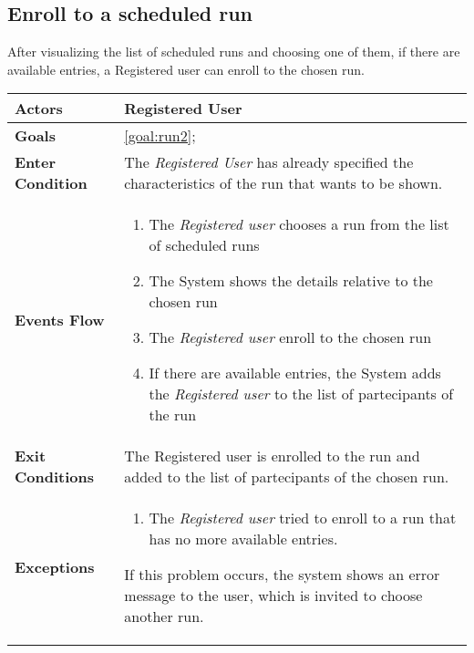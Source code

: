   \subsection{Enroll to a scheduled run}
After visualizing the list of scheduled runs and choosing one of them, if there are available entries, a Registered user can enroll to the chosen run. 

\begin{table}[H]
	\centering
    
    \begin{tabular}{|p{3.5cm}|p{10.3cm}|}
    
    \hline
    \textbf{\large{Actors}}  			& \tabitem Registered User 	\\
    				 					
    \hline
    \textbf{\large{Goals}} 				& \ref{goal:run2};\\
    
    \hline
    \textbf{\large{Enter Condition}}	& The \emph{Registered User} has already specified the characteristics of the run that wants to be shown.		\\
    
    \hline
    \textbf{\large{Events Flow}}		& \begin{enumerate}[leftmargin=0.5cm]
                                          	\item The \emph{Registered user} chooses a run from the list of scheduled runs 
                                          	 \item The System shows the details relative to the chosen run
                                            \item The \emph{Registered user} enroll to the chosen run
                                            \item If there are available entries, the System adds the \emph{Registered user} to the list of partecipants of the run
                                          \end{enumerate}
    										\\
    \hline
    \textbf{\large{Exit Conditions}}    & The Registered user is enrolled to the run and added to the list of partecipants of the chosen run.  \\
    
    \hline
    \textbf{\large{Exceptions}} 		& \begin{enumerate}[leftmargin=0.5cm]
                                          	\item The \emph{Registered user} tried to enroll to a run that has no more available entries.
                                          \end{enumerate}
    										If this problem occurs, the system shows an error message to the user, which is invited to choose another run.\\
    
    \hline
    
    
    \end{tabular}
	
\end{table}